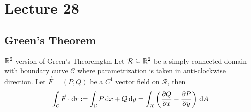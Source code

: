 \documentclass[../Analysis-3.tex]{subfiles}
\begin{document}
\chapter*{Lecture 28} %
\setcounter{chapter}{28} %
\setcounter{section}{0}


\section{Green's Theorem}
\begin{Thm}{$\mathbb{R}^2$ version of Green's Theorem}{gtm}
  Let $\mathcal{R} \subseteq \mathbb{R}^2 $ be a simply connected domain with boundary curve $\mathcal{C}$ where parametrization is taken in anti-clockwise direction. Let $\vec{F} = (P,Q)$ be a $C^1$ vector field on $\mathcal{R}$, then
  \[
    \int_{\mathcal{C}} \vec{F} \cdot \dd r := \int_{\mathcal{C}} P \, \dd x + Q \, \dd y = \int_{\mathcal{R}} \left( \pdv{Q}{x} - \pdv{P}{y}\right) \, \dd A
  \]
\end{Thm}
\end{document}
